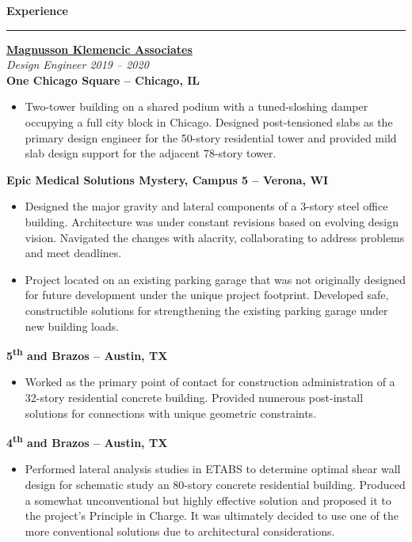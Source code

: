 \documentclass[letterpaper,6pt]{article}
\begin{document}
{\large \textbf{Experience}}
\hrule
\vspace{2mm}
\href{https://www.mka.com}{\textbf{Magnusson Klemencic Associates}} \\
\textit{Design Engineer \hfill 2019 -- 2020} \\
\textbf{\small{One Chicago Square -- Chicago, IL}}
\begin{itemize}[itemsep=0.5mm,topsep=0pt]
    \item  Two-tower building on a shared podium with a tuned-sloshing damper occupying a full city block in Chicago. Designed post-tensioned slabs as the primary design engineer for the 50-story residential tower and provided mild slab design support for the adjacent 78-story tower.
\end{itemize}
\vspace{1mm}
\textbf{\small{Epic Medical Solutions \textbar{} Mystery, Campus 5 -- Verona, WI}}
\begin{itemize}[itemsep=0.5mm,topsep=0pt]
    \item  Designed the major gravity and lateral components of a 3-story steel office building. Architecture was under constant revisions based on evolving design vision. Navigated the changes with alacrity, collaborating to address problems and meet deadlines.
    \item  Project located on an existing parking garage that was not originally designed for future development under the unique project footprint. Developed safe, constructible solutions for strengthening the existing parking garage under new building loads. 
\end{itemize}
\vspace{1mm}
\textbf{\small{5\textsuperscript{th} and Brazos -- Austin, TX}}
\begin{itemize}[itemsep=0.5mm,topsep=0pt]
    \item  Worked as the primary point of contact for construction administration of a 32-story residential concrete building. Provided numerous post-install solutions for connections with unique geometric constraints. 
\end{itemize}
\vspace{1mm}
\textbf{\small{4\textsuperscript{th} and Brazos -- Austin, TX}}
\begin{itemize}[itemsep=0.5mm,topsep=0pt]
    \item  Performed lateral analysis studies in ETABS to determine optimal shear wall design for schematic study an 80-story concrete residential building. Produced a somewhat unconventional but highly effective solution and proposed it to the project's Principle in Charge. It was ultimately decided to use one of the more conventional solutions due to architectural considerations.
\end{itemize}
\end{document}
